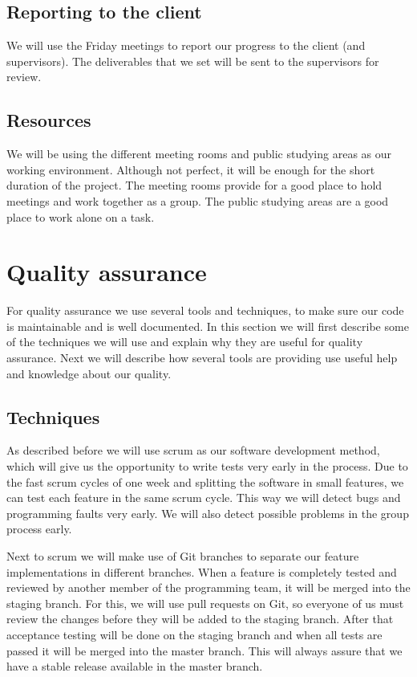 \documentclass[]{article}
\begin{document}
\subsection{Reporting to the client}
We will use the Friday meetings to report our progress to the client (and supervisors).
The deliverables that we set will be sent to the supervisors for review.

\subsection{Resources}
We will be using the different meeting rooms and public studying areas as our working environment.
Although not perfect, it will be enough for the short duration of the project.
The meeting rooms provide for a good place to hold meetings and work together as a group.
The public studying areas are a good place to work alone on a task.

\section{Quality assurance}
For quality assurance we use several tools and techniques, to make sure our code is maintainable and is well documented.
In this section we will first describe some of the techniques we will use and explain why they are useful for quality assurance.
Next we will describe how several tools are providing use useful help and knowledge about our quality.

\subsection{Techniques}
As described before we will use scrum as our software development method, which will give us the opportunity to write tests very early in the process.
Due to the fast scrum cycles of one week and splitting the software in small features, we can test each feature in the same scrum cycle.
This way we will detect bugs and programming faults very early.
We will also detect possible problems in the group process early.

Next to scrum we will make use of Git branches to separate our feature implementations in different branches.
When a feature is completely tested and reviewed by another member of the programming team, it will be merged into the staging branch.
For this, we will use pull requests on Git, so everyone of us must review the changes before they will be added to the staging branch.
After that acceptance testing will be done on the staging branch and when all tests are passed it will be merged into the master branch.
This will always assure that we have a stable release available in the master branch.
\end{document}
